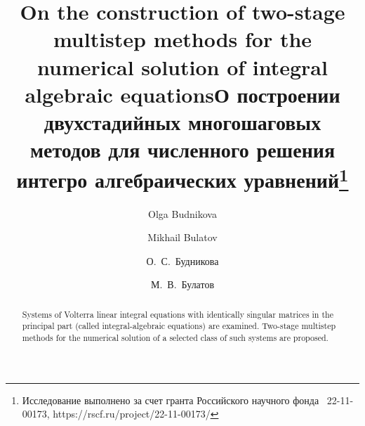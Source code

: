 \begin{englishtitle} %
\title{On the construction of two-stage multistep methods for the numerical solution of integral algebraic equations}
\author{Olga Budnikova   \and   Mikhail Bulatov
}

\maketitle

\begin{abstract}
Systems of Volterra linear integral equations with identically singular matrices in the principal part (called integral-algebraic equations) are examined. Two-stage multistep methods for the numerical solution of a selected class of such systems are proposed.

\end{abstract}
\end{englishtitle}


\iffalse
\documentclass[12pt]{llncs}


\usepackage{iftex}

\ifPDFTeX
\usepackage[T2A]{fontenc}
\usepackage[utf8]{inputenc} %
\usepackage[english,russian]{babel}
\fi

\usepackage{todonotes}

\usepackage[russian]{nla}




\fi

\title{О построении двухстадийных многошаговых методов для численного решения интегро алгебраических уравнений\thanks{Исследование выполнено за счет гранта Российского научного фонда \textnumero~22-11-00173, https://rscf.ru/project/22-11-00173/}}
\author{О.~С.~Будникова \and   М.~В.~Булатов
} %

